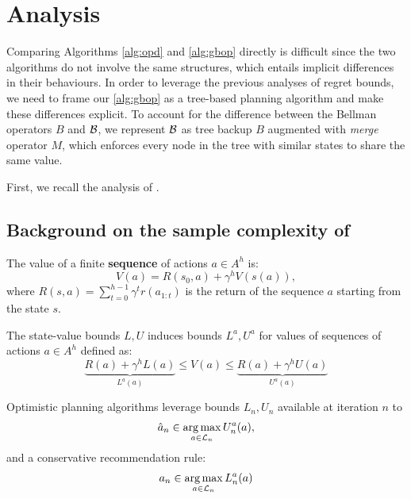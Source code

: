 \documentclass[runningheads]{llncs}
\begin{document}
\section{Analysis} 

Comparing Algorithms \ref{alg:opd} and \ref{alg:gbop} directly is difficult since the two algorithms do not involve the same structures, which entails implicit differences in their behaviours. In order to leverage the previous analyses of regret bounds, we need to frame our \autoref{alg:gbop} as a tree-based planning algorithm and make these differences explicit. To account for the difference between the Bellman operators $B$ and $\mathcal{B}$, we represent $\mathcal{B}$ as tree backup $B$ augmented with \emph{merge} operator $M$, which enforces every node in the tree with similar states to share the same value.

First, we recall the analysis of \OPD.

\subsection{Background on the sample complexity of \OPD}

\begin{definition}

%

The value of a finite \textbf{sequence} of actions $a\in A^h$ is:
\begin{equation}
\label{eq:state_value}
    V(a) = R(s_0,a) + \gamma^{h} V(s(a)),
\end{equation}
where $R(s, a) = \sum_{t=0}^{h-1} \gamma^t r(a_{1:t})$ is the return of the sequence $a$ starting from the state $s$.
\end{definition}

The state-value bounds $L,U$ induces bounds $L^a, U^a$ for values of sequences of actions $a\in A^h$ defined as:
\begin{equation}
\label{eq:sequence_value}
\underbrace{R(a) + \gamma^{h} L(a)}_{L^a(a)} \leq V(a) \leq \underbrace{R(a) + \gamma^{h} U(a)}_{U^a(a)}
\end{equation}


Optimistic planning algorithms leverage bounds $L_n, U_n$ available at iteration $n$ to  
\begin{equation}
\label{eq:sampling_rule}
\hat{a}_n \in \operatorname*{arg\,max}_{a\in\mathcal{L}_n} U_n^a(a),
\end{equation}
and a conservative recommendation rule:
\begin{equation}
\label{eq:recommendation_rule}
a_n \in \operatorname*{arg\,max}_{a\in\mathcal{L}_n} L^a_n(a)
\end{equation}
\end{document}

